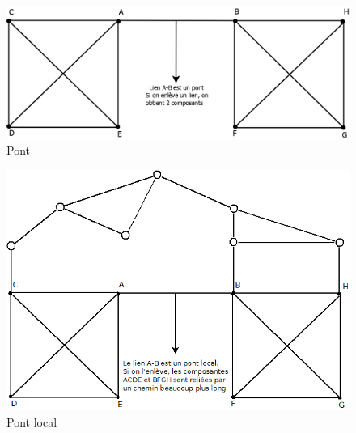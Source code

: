     \begin{figure}
    \center
    \includegraphics[scale=0.4]{images/18_Pont.png}
    \caption{\label{Pont} Pont}
    \end{figure}
    
    \begin{figure}
    \center
    \includegraphics[scale=0.5]{images/18_Pontlocal.png}
    \caption{\label{Pontlocal} Pont local}
    \end{figure}